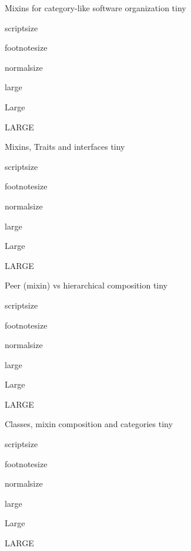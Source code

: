 \documentclass[final]{beamer}
\begin{document}
\begin{frame}{}
\begin{columns}[t]
\begin{column}{.3\linewidth}
  \begin{block}{\large Mixins for category-like software organization}
      \centering
      {\tiny tiny}\par
      {\scriptsize scriptsize}\par
      {\footnotesize footnotesize}\par
      {\normalsize normalsize}\par
      {\large large}\par
      {\Large Large}\par
      {\LARGE LARGE}\par
  \end{block}
  \hfill
  \begin{block}{\large Mixins, Traits and interfaces}
      \centering
      {\tiny tiny}\par
      {\scriptsize scriptsize}\par
      {\footnotesize footnotesize}\par
      {\normalsize normalsize}\par
      {\large large}\par
      {\Large Large}\par
      {\LARGE LARGE}\par
  \end{block}
  \hfill
  \begin{block}{\large Peer (mixin) vs hierarchical composition}
      \centering
      {\tiny tiny}\par
      {\scriptsize scriptsize}\par
      {\footnotesize footnotesize}\par
      {\normalsize normalsize}\par
      {\large large}\par
      {\Large Large}\par
      {\LARGE LARGE}\par
  \end{block}
  \hfill
  \begin{block}{\large Classes, mixin composition and categories}
      \centering
      {\tiny tiny}\par
      {\scriptsize scriptsize}\par
      {\footnotesize footnotesize}\par
      {\normalsize normalsize}\par
      {\large large}\par
      {\Large Large}\par
      {\LARGE LARGE}\par
  \end{block}

\end{column}

\end{columns}

\vfill
\end{frame}
\end{document}
